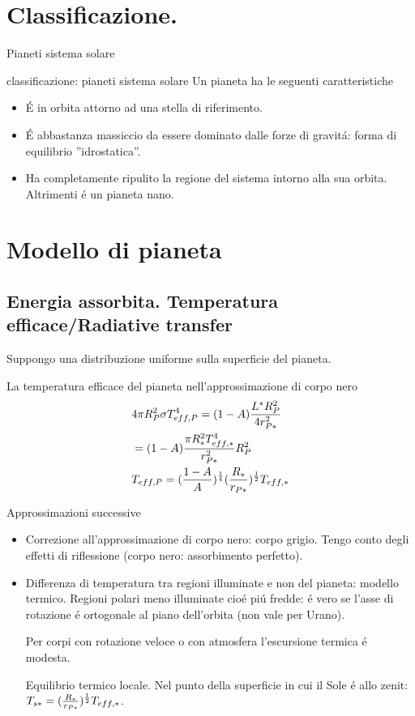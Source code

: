 \section{Classificazione.}

\begin{frame}{Pianeti sistema solare}
\end{frame}

\begin{wordonframe}{classificazione: pianeti sistema solare}
Un pianeta ha le seguenti caratteristiche
\begin{itemize}
    \item \'E in orbita attorno ad una stella di riferimento.
    \item \'E abbastanza massiccio da essere dominato dalle forze di gravit\'a: forma di equilibrio ''idrostatica''.
    \item Ha completamente ripulito la regione del sistema intorno alla sua orbita. Altrimenti \'e un pianeta nano.
\end{itemize}

\end{wordonframe}

\section{Modello di pianeta}

\subsection{Energia assorbita. Temperatura efficace/Radiative transfer}

Suppongo una distribuzione uniforme sulla superficie del pianeta.

La temperatura efficace del pianeta nell'approssimazione di corpo nero
\begin{align*}
&4\pi R_P^2\sigma T_{eff,P}^4=(1-A)\frac{L^*R_P^2}{4r_{P*}^2}\\
&=(1-A)\frac{\pi R_*^2T_{eff,*}^4}{r_{P*}^2}R_P^2\\
&T_{eff,P}=(\frac{1-A}{A})^{\frac{1}{4}}(\frac{R_*}{r_{P*}})^{\frac{1}{2}}T_{eff,*}
\end{align*}

Approssimazioni successive
\begin{itemize}
    \item Correzione all'approssimazione di corpo nero: corpo grigio. Tengo conto degli effetti di riflessione (corpo nero: assorbimento perfetto).
    \item Differenza di temperatura tra regioni illuminate e non del pianeta: modello termico. Regioni polari meno illuminate cio\'e pi\'u fredde: \'e vero se l'asse di rotazione \'e ortogonale al piano dell'orbita (non vale per Urano).
    
    Per corpi con rotazione veloce o con atmosfera l'escursione termica \'e modesta.
    
    Equilibrio termico locale. Nel punto della superficie in cui il Sole \'e allo zenit: $T_{s*}=(\frac{R_*}{r_{P*}})^{\frac{1}{2}}T_{eff,*}$.
\end{itemize}
